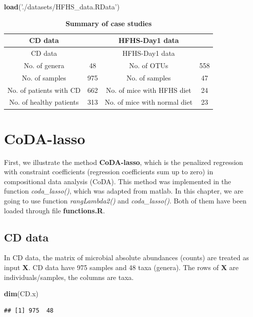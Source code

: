 \documentclass[openany]{book}
\newenvironment{Shaded}{\begin{snugshade}}{\end{snugshade}}
\newcommand{\KeywordTok}[1]{\textcolor[rgb]{0.13,0.29,0.53}{\textbf{#1}}}
\newcommand{\StringTok}[1]{\textcolor[rgb]{0.31,0.60,0.02}{#1}}
\newcommand{\NormalTok}[1]{#1}
\begin{document}
\begin{Shaded}
\begin{Highlighting}[]
\KeywordTok{load}\NormalTok{(}\StringTok{'./datasets/HFHS_data.RData'}\NormalTok{)}
\end{Highlighting}
\end{Shaded}

\begin{longtable}[]{@{}cccc@{}}
\caption{\label{tab:summary} \textbf{Summary of case
studies}}\tabularnewline
\toprule
CD data & & HFHS-Day1 data &\tabularnewline
\midrule
\endfirsthead
\toprule
CD data & & HFHS-Day1 data &\tabularnewline
\midrule
\endhead
No. of genera & 48 & No. of OTUs & 558\tabularnewline
No. of samples & 975 & No. of samples & 47\tabularnewline
No. of patients with CD & 662 & No. of mice with HFHS diet &
24\tabularnewline
No. of healthy patients & 313 & No. of mice with normal diet &
23\tabularnewline
\bottomrule
\end{longtable}

\chapter{CoDA-lasso}\label{coda}

First, we illustrate the method \textbf{CoDA-lasso}, which is the
penalized regression with constraint coefficients (regression
coefficients sum up to zero) \citep{lu2019generalized, lin2014variable}
in compositional data analysis (CoDA). This method was implemented in
the function \emph{coda\_lasso()}, which was adapted from matlab. In
this chapter, we are going to use function \emph{rangLambda2()} and
\emph{coda\_lasso()}. Both of them have been loaded through file
\textbf{functions.R}.

\section{CD data}\label{cd-data}

In CD data, the matrix of microbial absolute abundances (counts) are
treated as input \textbf{X}. CD data have 975 samples and 48 taxa
(genera). The rows of \textbf{X} are individuals/samples, the columns
are taxa.

\begin{Shaded}
\begin{Highlighting}[]
\KeywordTok{dim}\NormalTok{(CD.x)}
\end{Highlighting}
\end{Shaded}

\begin{verbatim}
## [1] 975  48
\end{verbatim}
\end{document}
